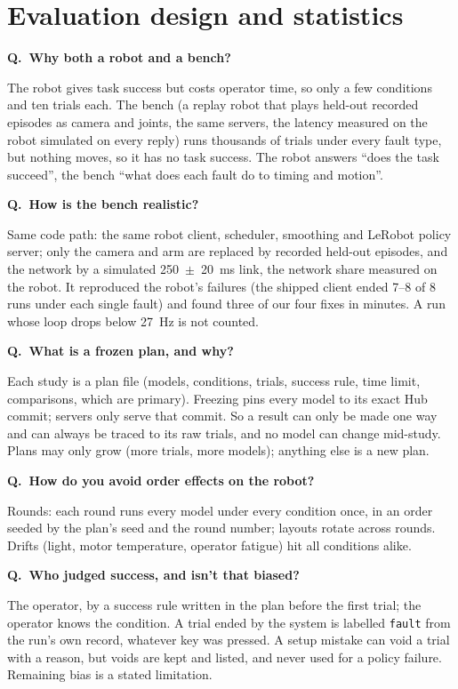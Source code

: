 \documentclass[11pt,a4paper]{article}
\newcounter{qn}
\newcommand{\q}[2]{\stepcounter{qn}\par\medskip
  {\bfseries\color{accent}Q\theqn.\ #1}\par\nopagebreak[4]#2\par}
\begin{document}
\section{Evaluation design and statistics}

\q{Why both a robot and a bench?}{The robot gives task success but costs operator time, so only a few conditions and
ten trials each. The bench (a replay robot that plays held-out recorded episodes as camera and joints, the same
servers, the latency measured on the robot simulated on every reply) runs thousands of trials under every fault type,
but nothing moves, so it has no task success. The robot answers \enquote{does the task succeed}, the bench
\enquote{what does each fault do to timing and motion}.}

\q{How is the bench realistic?}{Same code path: the same robot client, scheduler, smoothing and LeRobot policy server;
only the camera and arm are replaced by recorded held-out episodes, and the network by a simulated 250~$\pm$~20~ms
link, the network share measured on the robot. It reproduced the robot's failures (the shipped client ended 7--8 of 8
runs under each single fault) and found three of our four fixes in minutes. A run whose loop drops below 27~Hz is not
counted.}

\q{What is a frozen plan, and why?}{Each study is a plan file (models, conditions, trials, success rule, time limit,
comparisons, which are primary). Freezing pins every model to its exact Hub commit; servers only serve that commit.
So a result can only be made one way and can always be traced to its raw trials, and no model can change mid-study.
Plans may only grow (more trials, more models); anything else is a new plan.}

\q{How do you avoid order effects on the robot?}{Rounds: each round runs every model under every condition once, in
an order seeded by the plan's seed and the round number; layouts rotate across rounds. Drifts (light, motor
temperature, operator fatigue) hit all conditions alike.}

\q{Who judged success, and isn't that biased?}{The operator, by a success rule written in the plan before the first
trial; the operator knows the condition. A trial ended by the system is labelled \texttt{fault} from the run's own
record, whatever key was pressed. A setup mistake can void a trial with a reason, but voids are kept and listed, and
never used for a policy failure. Remaining bias is a stated limitation.}
\end{document}
